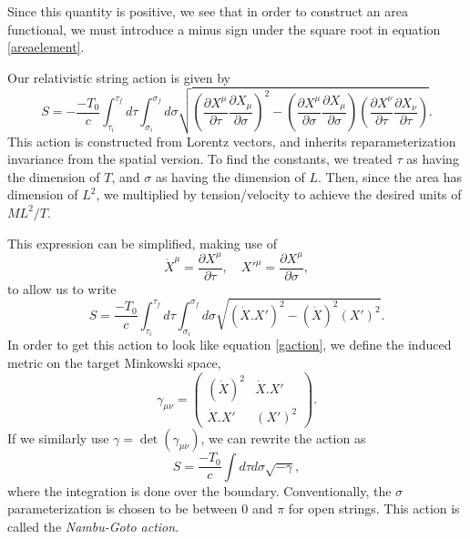 \documentclass[a4paper,12pt]{article}
\numberwithin{equation}{section}
\begin{document}
Since this quantity is positive, we see that in order to construct an area functional, we must introduce a minus sign under the square root in equation \ref{areaelement}. 

Our relativistic string action is given by
\begin{equation}
S = - \frac{-T_0}{c} \int_{\tau_i}^{\tau_f}d\tau \int_{\sigma_i}^{\sigma_f} d\sigma \sqrt{\left(\frac{\partial X^\mu}{\partial \tau}\frac{\partial X_\mu}{\partial \sigma}\right)^2 - \left(\frac{\partial X^\mu}{\partial \sigma}\frac{\partial X_\mu}{\partial \sigma}\right)\left(\frac{\partial X^\nu}{\partial \tau}\frac{\partial X_\nu}{\partial \tau}\right)}.
\end{equation}
This action is constructed from Lorentz vectors, and inherits reparameterization invariance from the spatial version. To find the constants, we treated $\tau$ as having the dimension of $T$, and $\sigma$ as having the dimension of $L$. Then, since the area has dimension of $L^2$, we multiplied by tension/velocity to achieve the desired units of $ML^2/T$. 

This expression can be simplified, making use of 
\begin{equation}
\dot{X}^\mu =\frac{\partial X^\mu}{\partial \tau}, \quad X'^\mu = \frac{\partial X^\mu}{\partial \sigma},  
\end{equation}
to allow us to write
\begin{equation}\label{contractedaction}
S = \frac{- T_0}{c} \int_{\tau_i}^{\tau_f} d\tau \int_{\sigma_i}^{\sigma_f} d\sigma \sqrt{(\dot{X}.X')^2 - (\dot{X})^2(X')^2}.
\end{equation}
In order to get this action to look like equation \ref{gaction}, we define the induced metric on the target Minkowski space, 
\begin{equation}
\gamma_{\mu \nu} = \begin{pmatrix} 
(\dot{X})^2 & \dot{X}.X' \\
 \dot{X}.X' & (X')^2 \end{pmatrix}.
\end{equation} 
If we similarly use $\gamma = \det(\gamma_{\mu \nu})$, we can rewrite the action as 
\begin{equation}
S = \frac{-T_0}{c}\int d\tau d\sigma \sqrt{-\gamma},
\end{equation}
where the integration is done over the boundary. Conventionally, the $\sigma$ parameterization is chosen to be between $0$ and $\pi$ for open strings. This action is called the \emph{Nambu-Goto action}.
\end{document}
